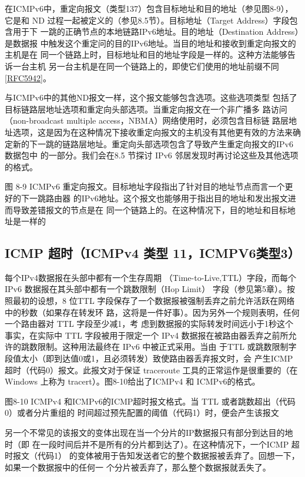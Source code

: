 在ICMPv6中，重定向报文（类型137）包含目标地址和目的地址（参见图8-9），它是和
ND 过程一起被定义的（参见8.5节）。目标地址（Target Address）字段包含用于下
一跳的正确节点的本地链路IPv6地址。目的地址（Destination Address）是数据报
中触发这个重定问的目的IPv6地址。当目的地址和接收到重定向报文的主机是在
同一个链路上时，目标地址和目的地址字段是一样的。这种方法能够告诉一台主机
另一台主机是在同一个链路上的，即使它们使用的地址前缀不同\href{https://www.rfc-editor.org/rfc/rfc5942}{[RFC5942]}。

与ICMPv6中的其他ND报文一样，这个报文能够包含选项。这些选项类型
包括了目标链路层地址选项和重定向头部选项。当重定向报文在一个非广播多
路访问 （non-broadcast multiple access，NBMA）网络使用时，必须包含目标链
路层地址选项，这是因为在这种情况下接收重定向报文的主机没有其他更有效的方法来确
定新的下一跳的链路层地址。重定向头部选项包含了导致产生重定向报文的IPv6数据包中
的一部分。我们会在8.5 节探讨 IPv6 邻居发现时再讨论这些及其他选项的格式。

图 8-9  ICMPv6 重定向报文。目标地址字段指出了针对目的地址节点而言一个更好的下一跳路由器
的IPv6地址。这个报文也能够用于指出目的地址和发出报文进而导致差错报文的节点是在
同一个链路上的。在这种情况下，目的地址和目标地址是一样的

\subsection{ICMP 超时（ICMPv4 类型 11，ICMPV6类型3）}
每个IPv4数据报在头部中都有一个生存周期 （Time-to-Live,TTL）字段，而每个IPv6
数据报在其头部中都有一个跳数限制（Hop Limit） 字段（参见第5章）。按照最初的设想，8
位TTL 字段保存了一个数据报被强制丢弃之前允许活跃在网络中的秒数（如果存在转发环
路，这将是一件好事）。因为另外一个规则表明，任何一个路由器对 TTL 字段至少减1，考
虑到数据报的实际转发时间远小于1秒这个事实，在实际中 TTL 字段被用于限定一个 IPv4
数据报在被路由器丢弃之前所允许的跳数限制。这种用法最终在 IPv6 中被正式采用。当由
于TTL 或跳数限制字段值太小（即到达值0或1，且必须转发）致使路由器丢弃报文时，会
产生ICMP超时（代码0）报文。此报文对于保证 traceroute 工具的正常运作是很重要的（在
Windows 上称为 tracert）。图8-10给出了ICMPv4 和 ICMPv6的格式。

图8-10  ICMPv4 和ICMPv6的ICMP超时报文格式。当 TTL 或者跳数超出（代码0）或者分片重组的
时间超过预先配置的阈值（代码1）时，便会产生该报文

另一个不常见的该报文的变体出现在当一个分片的IP数据报只有部分到达目的地时（即
在一段时间后并不是所有的分片都到达了）。在这种情况下，一个ICMP 超时报文（代码1）
的变体被用于告知发送者它的整个数据报被丢弃了。回想一下，如果一个数据报中的任何一
个分片被丢弃了，那么整个数据报就丢失了。

